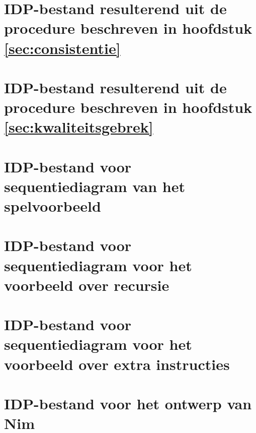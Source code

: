 \chapter{IDP-bestand resulterend uit de procedure beschreven in hoofdstuk \ref{sec:consistentie}}\label{app:consistentie}

\label{code:consistentie}

\chapter{IDP-bestand resulterend uit de procedure beschreven in hoofdstuk \ref{sec:kwaliteitsgebrek}}\label{app:kwaliteitsgebrek}

\label{code:kwaliteitsgebrek}

\chapter{IDP-bestand voor sequentiediagram van het spelvoorbeeld}\label{app:seq-diagram-game}

\label{code:seq-diagram-game}

\chapter{IDP-bestand voor sequentiediagram voor het voorbeeld over recursie}\label{app:seq-recursion}

\label{code:seq-recursion}

\chapter{IDP-bestand voor sequentiediagram voor het voorbeeld over extra instructies}\label{app:new-nim}

\label{code:new-nim}

\chapter{IDP-bestand voor het ontwerp van Nim}

